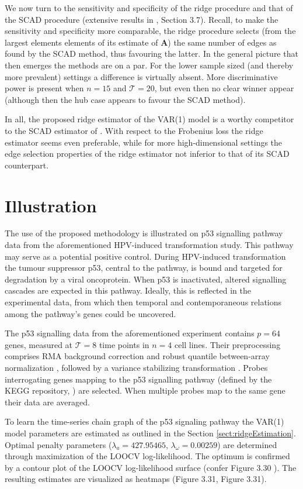 We now turn to the sensitivity and specificity of the ridge procedure and that of the SCAD procedure (extensive results in \cite{Miok2017}, Section 3.7). Recall, to make the sensitivity and specificity more comparable, the ridge procedure selects (from the largest elements elements of its estimate of $\mathbf{A}$) the same number of edges as found by the SCAD method, thus favouring the latter. In the general picture that then emerges the methods are on a par. For the lower sample sized (and thereby more prevalent) settings a difference is virtually absent. More discriminative power is present when $n=15$ and $\mathcal{T}=20$, but even then no clear winner appear (although then the hub case appears to favour the SCAD method). 

In all, the proposed ridge estimator of the VAR(1) model is a worthy competitor to the SCAD estimator of \cite{Abegaz2013}. With respect to the Frobenius loss the ridge estimator seems even preferable, while for more high-dimensional settings the edge selection properties of the ridge estimator not inferior to that of its SCAD counterpart.


\section{Illustration} \label{sect:illustration}
The use of the proposed methodology is illustrated on p53 signalling pathway data from the aforementioned HPV-induced transformation study. This pathway may serve as a potential positive control. During HPV-induced transformation the tumour suppressor p53, central to the pathway, is bound and targeted for degradation by a viral oncoprotein. When p53 is inactivated, altered signalling cascades are expected in this pathway. Ideally, this is reflected in the experimental data, from which then temporal and contemporaneous relations among the pathway's genes could be uncovered.

The p53 signalling data from the aforementioned experiment contains $p=64$ genes, measured at $\mathcal{T}=8$ time points in $n=4$ cell lines. Their preprocessing comprises RMA background correction \cite{Irizarry2003} and robust quantile between-array normalization \cite{Boldstad2003}, followed by a variance stabilizing transformation \cite{Huber2002}. Probes interrogating genes mapping to the p53 signalling pathway (defined by the KEGG repository, \cite{Kanehisa2000}) are selected. When multiple probes map to the same gene their data are averaged.

To learn the time-series chain graph of the p53 signaling pathway the VAR(1) model parameters are estimated as outlined in the Section \ref{sect:ridgeEstimation}. Optimal penalty parameters ($\lambda_a = 427.95465$, $\lambda_{\omega} = 0.00259$) are determined through maximization of the LOOCV log-likelihood. The optimum is confirmed by a contour plot of the LOOCV log-likelihood surface (confer Figure 3.30 \cite{Supp2018}). The resulting estimates are visualized as heatmaps (Figure 3.31, Figure 3.31).

